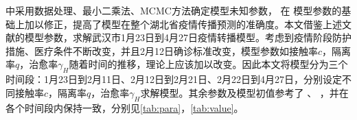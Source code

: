 \documentclass[withoutpre]{cumcmthesis} %
\begin{document}
 \cite{reference1}中采用数据处理、最小二乘法、MCMC方法确定模型未知参数， \cite{reference2}在 \cite{reference1}模型参数的基础上加以修正，提高了模型在整个湖北省疫情传播预测的准确度。本文借鉴上述文献的模型参数，求解武汉市1月23日到4月27日疫情转播模型。考虑到疫情阶段防护措施、医疗条件不断改变，并且2月12日确诊标准改变，模型参数如接触率$c$，隔离率$q$，治愈率$\gamma_H$随着时间的推移，理论上应该加以改变。因此本文将模型分为三个时间段：1月23日到2月11日、2月12日到2月21日、2月22日到4月27日，分别设定不同接触率$c$，隔离率$q$，治愈率$\gamma_H$求解模型。其余参数及模型初值参考了 \cite{reference1}、 \cite{reference2}，并在各个时间段内保持一致，分别见\cref{tab:para}，\cref{tab:value}。


\end{document}
